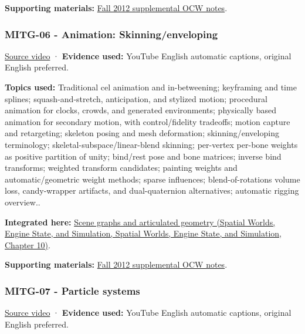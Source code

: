 \textbf{Supporting materials:} \href{https://ocw.mit.edu/courses/6-837-computer-graphics-fall-2012/pages/lecture-notes/}{Fall 2012 supplemental OCW notes}.

\subsubsection{MITG-06 - Animation: Skinning/enveloping}\label{04-visual-computing-ii-ch036-mitg-06---animation-skinningenveloping}

\href{https://www.youtube.com/watch?v=oAQkIAGKvUI}{Source video} · \textbf{Evidence used:} YouTube English automatic captions, original English preferred.

\textbf{Topics used:} Traditional cel animation and in-betweening; keyframing and time splines; squash-and-stretch, anticipation, and stylized motion; procedural animation for clocks, crowds, and generated environments; physically based animation for secondary motion, with control/fidelity tradeoffs; motion capture and retargeting; skeleton posing and mesh deformation; skinning/enveloping terminology; skeletal-subspace/linear-blend skinning; per-vertex per-bone weights as positive partition of unity; bind/rest pose and bone matrices; inverse bind transforms; weighted transform candidates; painting weights and automatic/geometric weight methods; sparse influences; blend-of-rotations volume loss, candy-wrapper artifacts, and dual-quaternion alternatives; automatic rigging overview..

\textbf{Integrated here:} \href{../05-Spatial-Worlds-Engine-State-and-Simulation/main.pdf\#nameddest=04-visual-computing-ii-ch029-scene-graphs-and-articulated-geometry}{Scene graphs and articulated geometry (Spatial Worlds, Engine State, and Simulation, Spatial Worlds, Engine State, and Simulation, Chapter 10)}.

\textbf{Supporting materials:} \href{https://ocw.mit.edu/courses/6-837-computer-graphics-fall-2012/pages/lecture-notes/}{Fall 2012 supplemental OCW notes}.

\subsubsection{MITG-07 - Particle systems}\label{04-visual-computing-ii-ch036-mitg-07---particle-systems}

\href{https://www.youtube.com/watch?v=-PGuhbZ2khE}{Source video} · \textbf{Evidence used:} YouTube English automatic captions, original English preferred.

